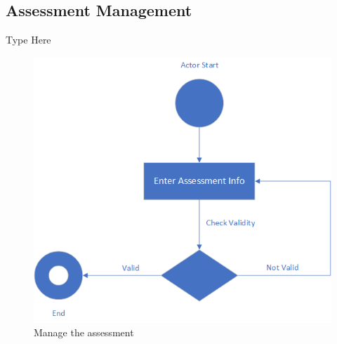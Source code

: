\documentclass[12pt,a4paper]{article}
\begin{document}
\subsection{Assessment Management}
Type Here
\begin{figure}[H]
  \centering
    \includegraphics[scale=1]{Assessment}

  \caption{Manage the assessment}
\end{figure}
\end{document}
